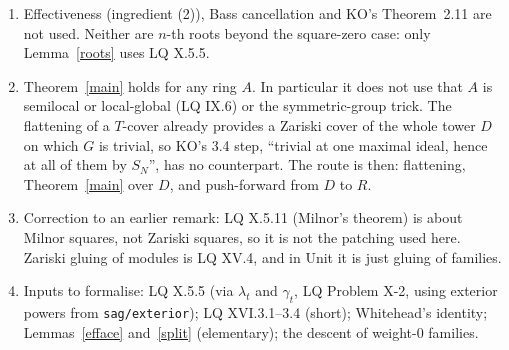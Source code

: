 \documentclass[11pt]{amsart}
\theoremstyle{definition}
\theoremstyle{remark}
\begin{document}
\begin{enumerate}
\item Effectiveness (ingredient (2)), Bass cancellation and KO's
  Theorem~2.11 are not used. Neither are $n$-th roots beyond the
  square-zero case: only Lemma~\ref{roots} uses LQ X.5.5.
\item Theorem~\ref{main} holds for any ring $A$. In particular it does not
  use that $A$ is semilocal or local-global (LQ IX.6) or the symmetric-group
  trick. The flattening of a $T$-cover already provides a Zariski cover of
  the whole tower $D$ on which $G$ is trivial, so KO's 3.4 step, ``trivial at
  one maximal ideal, hence at all of them by $S_N$'', has no counterpart.
  The route is then: flattening, Theorem~\ref{main} over $D$, and
  push-forward from $D$ to $R$.
\item Correction to an earlier remark: LQ X.5.11 (Milnor's theorem) is
  about Milnor squares, not Zariski squares, so it is not the patching used
  here. Zariski gluing of modules is LQ XV.4, and in Unit it is just gluing
  of families.
\item Inputs to formalise: LQ X.5.5 (via $\lambda_t$ and $\gamma_t$, LQ
  Problem X-2, using exterior powers from \texttt{sag/exterior}); LQ
  XVI.3.1--3.4 (short); Whitehead's identity; Lemmas~\ref{efface}
  and~\ref{split} (elementary); the descent of weight-$0$ families.
\end{enumerate}
\end{document}
